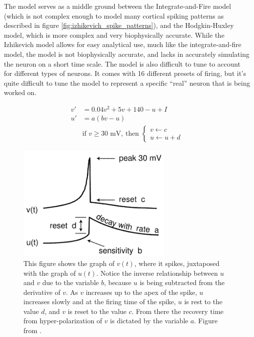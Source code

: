 \documentclass[11pt]{article}
\begin{document}
The model serves as a middle ground between the Integrate-and-Fire model (which is not complex enough to model many cortical spiking patterns as described in figure \ref{fig:izhikevich_spike_patterns}), and the Hodgkin-Huxley model, which is more complex and very biophysically accurate. While the Izhikevich model allows for easy analytical use, much like the integrate-and-fire model, the model is not biophysically accurate, and lacks in accurately simulating the neuron on a short time scale. The model is also difficult to tune to account for different types of neurons. It comes with 16 different presets of firing, but it's quite difficult to tune the model to represent a specific ``real'' neuron that is being worked on.

\begin{align}
    v' &= 0.04v^2 + 5v + 140 - u + I \label{eq:izhikevich_vprime} \\
    u' &= a(bv - u) \label{eq:izhikevich_uprime} \\
    & \text{if } v \geq 30 \text{ mV},~ \text{then } \begin{cases} v \leftarrow c \\ u \leftarrow u+d \end{cases} \label{eq:izhikevich_ifspike}
\end{align}

\begin{figure}[H]
    \centering
    \includegraphics[width=3in]{figures/izhikevich_variable_descriptions.png}
    \caption{This figure shows the graph of $v(t)$, where it spikes, juxtaposed with the graph of $u(t)$. Notice the inverse relationship between $u$ and $v$ due to the variable $b$, because $u$ is being subtracted from the derivative of $v$. As $v$ increases up to the apex of the spike, $u$ increases slowly and at the firing time of the spike, $u$ is rest to the value $d$, and $v$ is reset to the value $c$. From there the recovery time from hyper-polarization of $v$ is dictated by the variable $a$. Figure from \cite{izhikevich_model}.}
    \label{fig:izhikevich_variable_descriptions}
\end{figure}
\end{document}
